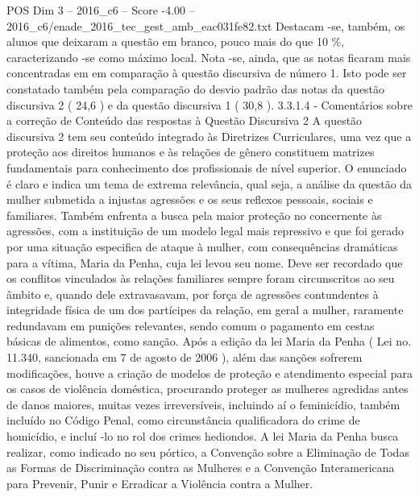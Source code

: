 \begin{textsample}{POS Dim 3 – 2016\_c6 – Score -4.00 – 2016\_c6/enade\_2016\_tec\_gest\_amb\_eac031fe82.txt}
Destacam -se, também, os alunos que deixaram a questão em branco, pouco mais do que 10 \%, caracterizando -se como máximo local.
Nota -se, ainda, que as notas ficaram mais concentradas em em comparação à questão discursiva de número 1.
Isto pode ser constatado também pela comparação do desvio padrão das notas da questão discursiva 2 ( 24,6 ) e da questão discursiva 1 ( 30,8 ). 3.3.1.4 - Comentários sobre a correção de Conteúdo das respostas à Questão Discursiva 2 A questão discursiva 2 tem seu conteúdo integrado às Diretrizes Curriculares, uma vez que a proteção aos direitos humanos e às relações de gênero constituem matrizes fundamentais para conhecimento dos profissionais de nível superior.
O enunciado é claro e indica um tema de extrema relevância, qual seja, a análise da questão da mulher submetida a injustas agressões e os seus reflexos pessoais, sociais e familiares.
Também enfrenta a busca pela maior proteção no concernente às agressões, com a instituição de um modelo legal mais repressivo e que foi gerado por uma situação especifica de ataque à mulher, com consequências dramáticas para a vítima, Maria da Penha, cuja lei levou seu nome.
Deve ser recordado que os conflitos vinculados às relações familiares sempre foram circunscritos ao seu âmbito e, quando dele extravasavam, por força de agressões contundentes à integridade física de um dos partícipes da relação, em geral a mulher, raramente redundavam em punições relevantes, sendo comum o pagamento em cestas básicas de alimentos, como sanção.
Após a edição da lei Maria da Penha ( Lei no. 11.340, sancionada em 7 de agosto de 2006 ), além das sanções sofrerem modificações, houve a criação de modelos de proteção e atendimento especial para os casos de violência doméstica, procurando proteger as mulheres agredidas antes de danos maiores, muitas vezes irreversíveis, incluindo aí o feminicídio, também incluído no Código Penal, como circunstância qualificadora do crime de homicídio, e incluí -lo no rol dos crimes hediondos.
A lei Maria da Penha busca realizar, como indicado no seu pórtico, a Convenção sobre a Eliminação de Todas as Formas de Discriminação contra as Mulheres e a Convenção Interamericana para Prevenir, Punir e Erradicar a Violência contra a Mulher.

\end{textsample}
